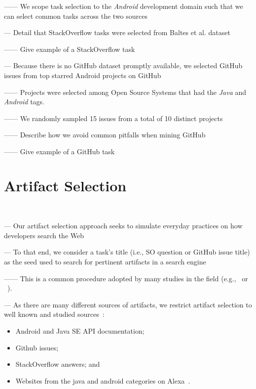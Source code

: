 ------ We scope task selection to the \textit{Android} development domain such that we can select common tasks across the two sources \vspace{3mm}



--- Detail that StackOverflow tasks were selected from Baltes et al. dataset~\cite{baltes2019-rep}

------ Give example of a StackOverflow task \vspace{5mm}

--- Because there is no GitHub dataset promptly available, we selected GitHub issues from top starred Android projects on GitHub 

------ Projects were selected among Open Source Systems that had the \textit{Java} and \textit{Android} tags. 

------ We randomly sampled 15 issues from a total of 10 distinct projects

------ Describe how we avoid common pitfalls  when mining GitHub~\cite{kalliamvakou2014}

------ Give example of a GitHub task 

\section{Artifact Selection}
\label{cp4:corpus-artifacts}
\textcolor{white}{force ident} %


--- Our artifact selection approach seeks to simulate everyday practices on how developers search the Web~\cite{rao2020, Xia2017} \vspace{3mm}

--- To that end, we consider a task's title (i.e., SO question or GitHub issue title) as the seed used to search for pertinent artifacts in a search engine

------ This is a common procedure adopted by many studies in the field (e.g.,~\cite{Xu2017} or ~\cite{Silva2019}). \vspace{3mm}


--- As there are many different sources of artifacts, we restrict artifact selection to well known and studied sources~\cite{Starke2009,Kevic2014, Li2013}:


\begin{itemize}
    \item Android and Java SE API documentation;
    \item Github issues;
    \item StackOverflow answers; and
    \item Websites from the java and android categories on Alexa~\cite{alexa}.
\end{itemize}


